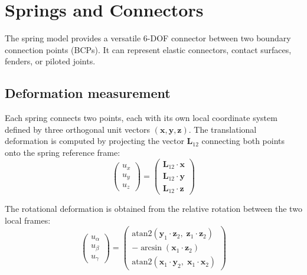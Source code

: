 \documentclass[11pt]{article}
\begin{document}
\section{Springs and Connectors}
\label{sec:springs}

The spring model provides a versatile 6-DOF connector between two boundary connection points (BCPs). It can represent elastic connectors, contact surfaces, fenders, or piloted joints.

\subsection{Deformation measurement}

Each spring connects two points, each with its own local coordinate system defined by three orthogonal unit vectors $(\mathbf{x},\mathbf{y},\mathbf{z})$. The translational deformation is computed by projecting the vector $\mathbf{L}_{12}$ connecting both points onto the spring reference frame:
\begin{equation}
\begin{pmatrix} u_x \\ u_y \\ u_z \end{pmatrix} = \begin{pmatrix} \mathbf{L}_{12}\cdot\mathbf{x} \\ \mathbf{L}_{12}\cdot\mathbf{y} \\ \mathbf{L}_{12}\cdot\mathbf{z} \end{pmatrix}
\end{equation}

The rotational deformation is obtained from the relative rotation between the two local frames:
\begin{equation}
\begin{pmatrix} u_\alpha \\ u_\beta \\ u_\gamma \end{pmatrix} = \begin{pmatrix} \text{atan2}(\mathbf{y}_1\cdot\mathbf{z}_2,\;\mathbf{z}_1\cdot\mathbf{z}_2) \\ -\arcsin(\mathbf{x}_1\cdot\mathbf{z}_2) \\ \text{atan2}(\mathbf{x}_1\cdot\mathbf{y}_2,\;\mathbf{x}_1\cdot\mathbf{x}_2) \end{pmatrix}
\end{equation}
\end{document}
